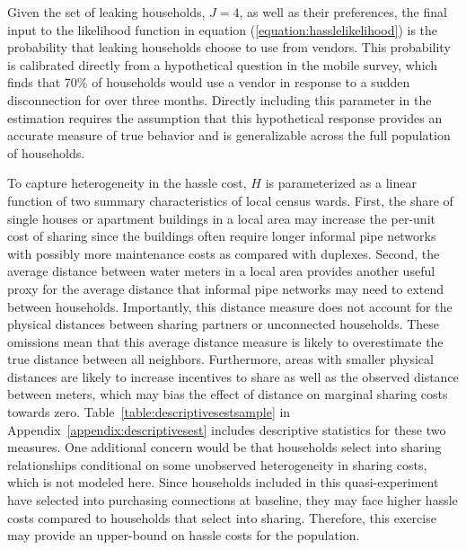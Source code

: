 \documentclass[12pt]{article}
\begin{document}
Given the set of leaking households, $J=4$, as well as their preferences, the final input to the likelihood function in equation (\ref{equation:hasslelikelihood}) is the probability that leaking households choose to use from vendors.  This probability is calibrated directly from a hypothetical question in the mobile survey, which finds that 70\% of households would use a vendor in response to a sudden disconnection for over three months.  Directly including this parameter in the estimation requires the assumption that this hypothetical response provides an accurate measure of true behavior and is generalizable across the full population of households.

To capture heterogeneity in the hassle cost, $H$ is parameterized as a linear function of two summary characteristics of local census wards.  First, the share of single houses or apartment buildings in a local area may increase the per-unit cost of sharing since the buildings often require longer informal pipe networks with possibly more maintenance costs as compared with duplexes.  Second, the average distance between water meters in a local area provides another useful proxy for the average distance that informal pipe networks may need to extend between households.  Importantly, this distance measure does not account for the physical distances between sharing partners or unconnected households.  These omissions mean that this average distance measure is likely to overestimate the true distance between all neighbors.  Furthermore, areas with smaller physical distances are likely to increase incentives to share as well as the observed distance between meters, which may bias the effect of distance on marginal sharing costs towards zero.  Table~\ref{table:descriptivesestsample} in Appendix~\ref{appendix:descriptivesest} includes descriptive statistics for these two measures.  One additional concern would be that households select into sharing relationships conditional on some unobserved heterogeneity in sharing costs, which is not modeled here.  Since households included in this quasi-experiment have selected into purchasing connections at baseline, they may face higher hassle costs compared to households that select into sharing.  Therefore, this exercise may provide an upper-bound on hassle costs for the population. 

\end{document}
